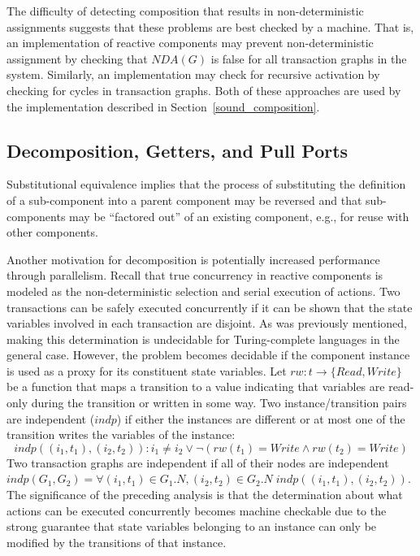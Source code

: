 The difficulty of detecting composition that results in non-deterministic assignments suggests that these problems are best checked by a machine.
That is, an implementation of reactive components may prevent non-deterministic assignment by checking that $\mathit{NDA}(G)$ is false for all transaction graphs in the system.
Similarly, an implementation may check for recursive activation by checking for cycles in transaction graphs.
Both of these approaches are used by the implementation described in Section~\ref{sound_composition}.

\subsection{Decomposition, Getters, and Pull Ports}
\label{decomposition}
Substitutional equivalence implies that the process of substituting the definition of a sub-component into a parent component may be reversed and that sub-components may be ``factored out'' of an existing component, e.g., for reuse with other components.

Another motivation for decomposition is potentially increased performance through parallelism.
Recall that true concurrency in reactive components is modeled as the non-deterministic selection and serial execution of actions.
Two transactions can be safely executed concurrently if it can be shown that the state variables involved in each transaction are disjoint.
As was previously mentioned, making this determination is undecidable for Turing-complete languages in the general case.
However, the problem becomes decidable if the component instance is used as a proxy for its constituent state variables.
Let $\mathit{rw}: t \to \{ \mathit{Read}, \mathit{Write} \}$ be a function that maps a transition to a value indicating that variables are read-only during the transition or written in some way.
Two instance/transition pairs are independent ($\mathit{indp}$) if either the instances are different or at most one of the transition writes the variables of the instance:
\begin{displaymath}
\mathit{indp}((i_1, t_1), (i_2, t_2)): i_1 \ne i_2 \lor \lnot (\mathit{rw}(t_1) = \mathit{Write} \land \mathit{rw}(t_2) = \mathit{Write})
\end{displaymath}
Two transaction graphs are independent if all of their nodes are independent $\mathit{indp}(G_1, G_2) = \forall (i_1, t_1) \in G_1.N, (i_2, t_2) \in G_2.N \; \mathit{indp}((i_1, t_1), (i_2, t_2))$.
The significance of the preceding analysis is that the determination about what actions can be executed concurrently becomes machine checkable due to the strong guarantee that state variables belonging to an instance can only be modified by the transitions of that instance.

